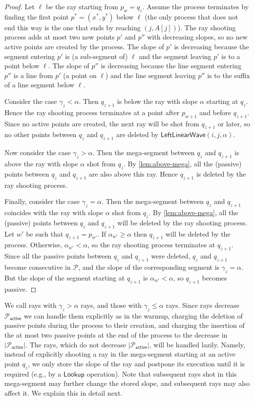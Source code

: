 \documentclass[a4paper,UKenglish,cleveref, autoref, thm-restate]{lipics-v2021}
\newcommand{\LLW}{\mathsf{LeftLinearWave}}
\newcommand{\local}{\text{short }}
\newcommand{\longrange}{\text{long }}
\newcommand{\Lookup}{\mathsf{Lookup}}
\renewcommand{\P}{\mathcal{P}}
\newcommand{\AP}{\P_{\mathsf{active}}}
\begin{document}
\begin{proof}
Let $\ell$ be the ray starting from $p_w=q_z$. Assume the process terminates by finding the first point $p^* = (x^*,y^*)$ below $\ell$ (the only process that does not end this way is the one that ends by reaching $(j,A[j])$).
The ray shooting process adds at most two new points $p'$ and $p''$ with decreasing slopes, so no new active points are created by the process.
The slope of $p'$ is decreasing because the segment entering $p'$ is (a sub-segment of) $\ell$ and the segment leaving $p'$ is to a point below $\ell$.
The slope of $p''$ is decreasing because the line segment entering $p''$ is a line from $p'$ (a point on $\ell$) and the line segment leaving $p''$ is to the suffix of a line segment below $\ell$.
 
Consider the case $\gamma_z < \alpha$. Then $q_{z+1}$ is below the ray with slope $\alpha$ starting at $q_z$. 
Hence the ray shooting process terminates at a point after $p_{w+1}$ and before $q_{z+1}$. Since no active points are created, the next ray will be shot from $q_{z+1}$ or later, so no other points between $q_z$ and $q_{z+1}$ are deleted by $\LLW(i,j,\alpha)$. 

Now consider the case $\gamma_z > \alpha$. Then the mega-segment between $q_z$ and $q_{z+1}$ is above the ray with slope $\alpha$ shot from $q_z$. By \cref{lem:above-mega}, all the (passive) points between $q_z$ and $q_{z+1}$ are also above this ray. Hence $q_{z+1}$ is deleted by the ray shooting process.

Finally, consider the case $ \gamma_z=\alpha$. Then the mega-segment between $q_z$ and $q_{z+1}$ coincides with the ray with slope $\alpha$ shot from $q_z$. By \cref{lem:above-mega}, all the (passive) points between $q_z$ and $q_{z+1}$ will be deleted by the ray shooting process. Let $w'$ be such that $q_{z+1}=p_{w'}$. If $\alpha_{w'} \geq \alpha$ then $q_{z+1}$ will be deleted by the process. Otherwise, $\alpha_{w'} < \alpha$, so the ray shooting process terminates at $q_{z+1}$. Since all the passive points between $q_z$ and $q_{z+1}$ were deleted, $q_z$ and $q_{z+1}$ become consecutive in $\P$, and the slope of the corresponding segment is $\gamma_z = \alpha$. But the slope of the segment starting at $q_{z+1}$ is $\alpha_{w'} < \alpha$, so $q_{z+1}$ becomes passive.
\end{proof}

We call rays with $\gamma_z > \alpha$ \emph{\longrange}rays, and those with $\gamma_z \le \alpha$ \emph{\local}rays. Since \longrange rays decrease $\AP$ we can handle them explicitly as in the warmup, charging the deletion of passive points during the process to their creation, and charging the insertion of the at most two passive points at the end of the process to the decrease in $|\AP|$. The \local rays, which do not decrease $|\AP|$, will be handled lazily. Namely, instead of explicitly shooting a \local ray in the mega-segment starting at an active point $q_z$, we only store the slope of the ray and postpone its execution until it is required (e.g., by a $\Lookup$ operation). Note that subsequent \local rays shot in this mega-segment may further change the stored slope, and subsequent \longrange rays may also affect it. We explain this in detail next. 
\end{document}

